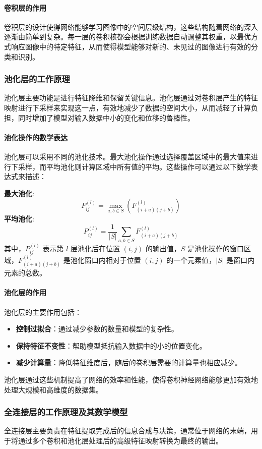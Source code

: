 \documentclass[a4paper,12pt]{article}
\begin{document}
\paragraph{卷积层的作用}
卷积层的设计使得网络能够学习图像中的空间层级结构，这些结构随着网络的深入逐渐由简单到复杂。每一层的卷积核都会根据训练数据自动调整其权重，以最优方式响应图像中的特定特征，从而使得模型能够对新的、未见过的图像进行有效的分类和识别。


\subsubsection*{池化层的工作原理}
池化层主要功能是进行特征降维和保留关键信息。池化层通过对卷积层产生的特征映射进行下采样来实现这一点，有效地减少了数据的空间大小，从而减轻了计算负担，同时增加了模型对输入数据中小的变化和位移的鲁棒性。

\paragraph{池化操作的数学表达}
池化层可以采用不同的池化技术。最大池化操作通过选择覆盖区域中的最大值来进行下采样，而平均池化则计算区域中所有值的平均。这些操作可以通过以下数学表达式来描述：

\textbf{最大池化}:
\[
P_{ij}^{(l)} = \max_{a,b \in S}(F_{(i+a)(j+b)}^{(l)})
\]
\textbf{平均池化}:
\[
P_{ij}^{(l)} = \frac{1}{|S|}\sum_{a,b \in S} F_{(i+a)(j+b)}^{(l)}
\]
其中，\( P_{ij}^{(l)} \) 表示第 \( l \) 层池化后在位置 \( (i, j) \) 的输出值，\( S \) 是池化操作的窗口区域，\( F_{(i+a)(j+b)}^{(l)} \) 是池化窗口内相对于位置 \( (i, j) \) 的一个元素值，\( |S| \) 是窗口内元素的总数。

\paragraph{池化层的作用}
池化层的主要作用包括：
\begin{itemize}
	\item \textbf{控制过拟合}：通过减少参数的数量和模型的复杂性。
	\item \textbf{保持特征不变性}：帮助模型抵抗输入数据中的小的位置变化。
	\item \textbf{减少计算量}：降低特征维度后，随后的卷积层需要的计算量也相应减少。
\end{itemize}

池化层通过这些机制提高了网络的效率和性能，使得卷积神经网络能够更加有效地处理大规模和高维度的数据集。


\subsubsection*{全连接层的工作原理及其数学模型}
全连接层主要负责在特征提取完成后的信息合成与决策，通常位于网络的末端，用于将通过多个卷积和池化层处理后的高级特征映射转换为最终的输出。
\end{document}
